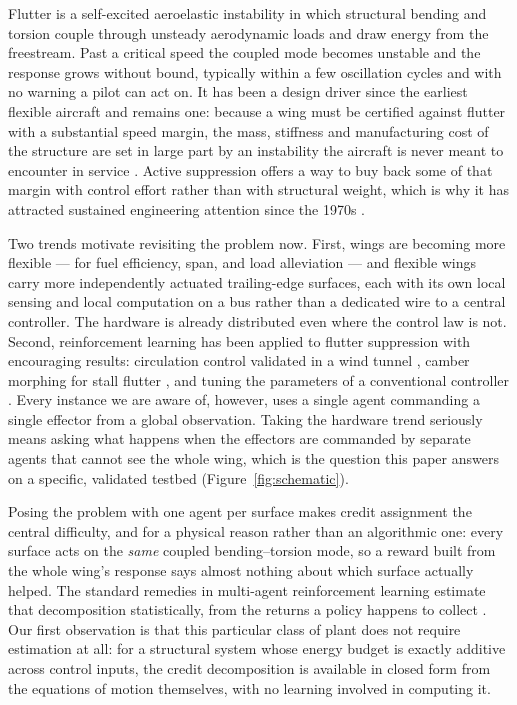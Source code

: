 \documentclass[preprint,11pt,authoryear]{elsarticle}
\begin{document}
Flutter is a self-excited aeroelastic instability in which structural bending and
torsion couple through unsteady aerodynamic loads and draw energy from the
freestream. Past a critical speed the coupled mode becomes unstable and the
response grows without bound, typically within a few oscillation cycles and with
no warning a pilot can act on. It has been a design driver since the earliest
flexible aircraft and remains one: because a wing must be certified against
flutter with a substantial speed margin, the mass, stiffness and manufacturing
cost of the structure are set in large part by an instability the aircraft is
never meant to encounter in service \citep{livne2018flutter,
mukhopadhyay2003historical}. Active suppression offers a way to buy back some of
that margin with control effort rather than with structural weight, which is why
it has attracted sustained engineering attention since the 1970s
\citep{karpel1982design,waszak2001robust,block1998applied}.

Two trends motivate revisiting the problem now. First, wings are becoming more
flexible --- for fuel efficiency, span, and load alleviation --- and flexible
wings carry more independently actuated trailing-edge surfaces, each with its own
local sensing and local computation on a bus rather than a dedicated wire to a
central controller. The hardware is already distributed even where the control
law is not. Second, reinforcement learning has been applied to flutter
suppression with encouraging results: circulation control validated in a wind
tunnel \citep{circulation2023}, camber morphing for stall flutter
\citep{stallflutter2025}, and tuning the parameters of a conventional controller
\citep{flyingwing2022}. Every instance we are aware of, however, uses a single
agent commanding a single effector from a global observation. Taking the
hardware trend seriously means asking what happens when the effectors are
commanded by separate agents that cannot see the whole wing, which is the
question this paper answers on a specific, validated testbed
(Figure~\ref{fig:schematic}).

Posing the problem with one agent per surface makes credit assignment the central
difficulty, and for a physical reason rather than an algorithmic one: every
surface acts on the \emph{same} coupled bending--torsion mode, so a reward built
from the whole wing's response says almost nothing about which surface actually
helped. The standard remedies in multi-agent reinforcement learning estimate that
decomposition statistically, from the returns a policy happens to collect
\citep{sunehag2018vdn,rashid2018qmix,foerster2018coma}. Our first observation is
that this particular class of plant does not require estimation at all: for a
structural system whose energy budget is exactly additive across control inputs,
the credit decomposition is available in closed form from the equations of
motion themselves, with no learning involved in computing it.
\end{document}
